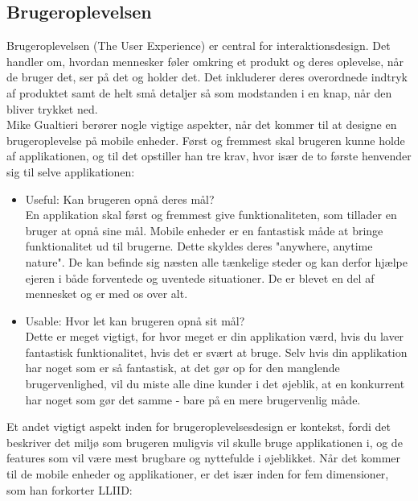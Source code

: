 \documentclass[a4paper,10pt,titlepage]{article}
\begin{document}
\subsection{Brugeroplevelsen}
Brugeroplevelsen (The User Experience) er central for interaktionsdesign. Det handler om, hvordan mennesker føler omkring et produkt og deres oplevelse, når de bruger det, ser på det og holder det. Det inkluderer deres overordnede indtryk af produktet samt de helt små detaljer så som modstanden i en knap, når den bliver trykket ned. \\
Mike Gualtieri\parencite{AppBestPractice} berører nogle vigtige aspekter, når det kommer til at designe en brugeroplevelse på mobile enheder. Først og fremmest skal brugeren kunne holde af applikationen, og til det opstiller han tre krav, hvor især de to første henvender sig til selve applikationen:
\begin{itemize}
\item
Useful: Kan brugeren opnå deres mål?\\
En applikation skal først og fremmest give funktionaliteten, som tillader en bruger at opnå sine mål. Mobile enheder er en fantastisk måde at bringe funktionalitet ud til brugerne. Dette skyldes deres "anywhere, anytime nature". De kan befinde sig næsten alle tænkelige steder og kan derfor hjælpe ejeren i både forventede og uventede situationer. De er blevet en del af mennesket og er med os over alt.
\item
Usable: Hvor let kan brugeren opnå sit mål?\\
Dette er meget vigtigt, for hvor meget er din applikation værd, hvis du laver fantastisk funktionalitet, hvis det er svært at bruge. Selv hvis din applikation har noget som er så fantastisk, at det gør op for den manglende brugervenlighed, vil du miste alle dine kunder i det øjeblik, at en konkurrent har noget som gør det samme - bare på en mere brugervenlig måde.
\end{itemize}
Et andet vigtigt aspekt inden for brugeroplevelsesdesign er kontekst, fordi det beskriver det miljø som brugeren muligvis vil skulle bruge applikationen i, og de features som vil være mest brugbare og nyttefulde i øjeblikket. Når det kommer til de mobile enheder og applikationer, er det især inden for fem dimensioner, som han forkorter LLIID:
\end{document}
